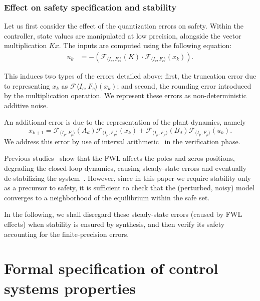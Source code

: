 \documentclass[twocolumn]{autart}    %
\begin{document}
\subsubsection{Effect on safety specification and stability}

Let us first consider the effect of the quantization errors on safety. 
Within the controller, state values are manipulated at low precision,
alongside the vector multiplication $Kx$.
The inputs are computed using the following equation: 
%
\begin{align*}
u_{k}&=-(\mathcal{F}_{\langle I_c,F_c \rangle}(K)\cdot\mathcal{F}_{\langle I_c,F_c \rangle}(x_{k})). 
\end{align*}

This induces two types of the errors detailed above: first, the truncation
error due to representing $x_k$ as $\mathcal{F}{\langle I_c,F_c
\rangle}(x_{k})$; and second, the rounding error introduced by the
multiplication operation.  We represent these errors as non-deterministic
additive noise.

An additional error is due to the representation of the plant dynamics, namely 
%
{\scriptsize
\begin{equation}
x_{k+1} =\mathcal{F}_{\langle I_p,F_p \rangle}(A_d) \mathcal{F}_{\langle I_p,F_p \rangle}(x_{k}) + \mathcal{F}_{\langle I_p,F_p \rangle}(B_d)\mathcal{F}_{\langle I_p,F_p \rangle}(u_{k}).
\end{equation}
}
We address this error by use of interval
arithmetic~\cite{moore1966interval} in the verification phase.

Previous studies~\cite{gangli1} show that the FWL affects the poles and
zeros positions, degrading the closed-loop dynamics, causing steady-state
errors and eventually de-stabilizing the system~\cite{Bessa16}.  However,
since in this paper we require stability only as a precursor to safety, it
is sufficient to check that the (perturbed, noisy) model converges to a
neighborhood of the equilibrium within the safe set.

In the following, we shall disregard these steady-state errors (caused by
FWL effects) when stability is ensured by synthesis, and then verify its
safety accounting for the finite-precision errors.

\section{Formal specification of control systems properties} 
\label{sec:specification}
\end{document}
